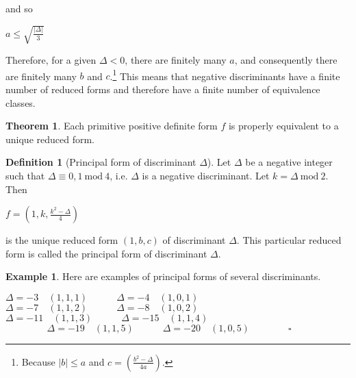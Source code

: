 \documentclass{article}
\theoremstyle{definition}
\newtheorem{definition}{Definition}[section]
\theoremstyle{theorem}
\newtheorem{theorem}{Theorem}[section]
\theoremstyle{example}
\newtheorem{example}{Example}[section]
\theoremstyle{corollary}
\begin{document}
and so

\begin{center}
\(a \le \sqrt{\frac{|\Delta |}{3}}\)
\end{center}

\bigskip

Therefore, for a given \(\Delta < 0\), there are finitely many \(a\), and consequently there are finitely many \(b\) and \(c\).\footnote{Because \(|b| \le a\) and \(c = \left( \frac{b^{2} - \Delta}{4a}\right)\).} This means that negative discriminants have a finite number of reduced forms and therefore have a finite number of equivalence classes.

\bigskip

\theoremstyle{theorem}
\begin{theorem}
Each primitive positive definite form \(f\) is properly equivalent to a unique reduced form.
\end{theorem}

\bigskip

\theoremstyle{definition}
\begin{definition}[Principal form of discriminant \(\Delta\)]
Let \(\Delta\) be a negative integer such that \(\Delta \equiv 0, 1 \ \textrm{mod} \ 4\), i.e. \(\Delta\) is a negative discriminant. Let \(k = \Delta \ \textrm{mod} \ 2\). Then
\begin{center}
\(f = \left(1, k, \frac{k^{2} - \Delta}{4}\right)\)
\end{center}
is the unique reduced form \((1, b, c)\) of discriminant \(\Delta\). This particular reduced form is called the principal form of discriminant \(\Delta\).
\end{definition}

\bigskip

\theoremstyle{example}
\begin{example}
Here are examples of principal forms of several discriminants.
\begin{center}
\(\Delta = -3 \quad (1, 1, 1) \quad \quad \quad \Delta = -4 \quad (1, 0, 1)\) \\
\(\Delta = -7 \quad (1, 1, 2) \quad \quad \quad \Delta = -8 \quad (1, 0, 2)\) \\
\(\Delta = -11 \quad (1, 1, 3) \quad \quad \quad \Delta = -15 \quad (1, 1, 4)\) \\
\(\phantom{\quad \quad \quad \quad \square} \Delta = -19 \quad (1, 1, 5) \quad \quad \quad \Delta = -20 \quad (1, 0, 5) \quad \quad \quad \quad \square\)
\end{center}
\end{example}
\end{document}
